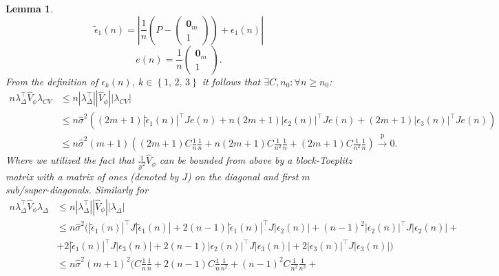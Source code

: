 \documentclass[11pt,dvipsnames]{article}
\newtheorem{lemma}{Lemma}
\begin{document}
\begin{appendices}
\begin{lemma}
\begin{equation}
\tilde{\epsilon}_{1}(n)=|\frac{1}{n}\left( P- \begin{pmatrix} \mathbf{0}_{m}\\1\end{pmatrix} \right) +\epsilon_{1}(n)|
\end{equation}
\begin{equation}
e(n)=\frac{1}{n}\begin{pmatrix} \mathbf{0}_{m}\\1\end{pmatrix} .
\end{equation}
From the definition of $ \epsilon_{k}(n) $, $ k \in \left\lbrace 1,\,2,\,3 \right\rbrace  $ it follows that $ \exists C, n_{0} : \forall n \geq n_{0} $:
\begin{equation}
\begin{split}
n\lambda_{\Delta}^{\top} \widehat{V}_{\phi} \lambda_{CV} &\leq n|\lambda_{\Delta}^{\top}| |\widehat{V}_{\phi}|| \lambda_{CV}|\\
&\leq n\hat{\sigma}^{2}\left(  (2m+1) |\tilde{\epsilon}_{1}(n)|^{\top}J e(n)+
n(2m+1)|\epsilon_{2}(n)|^{\top}J e(n)+
(2m+1)|\epsilon_{3}(n)|^{\top}J e(n)\right) \\
&\leq n\hat{\sigma}^{2}(m+1)\left( (2m+1) C \frac{1}{n}\frac{1}{n} + n(2m+1)C\frac{1}{n^{2}}\frac{1}{n} + (2m+1)C\frac{1}{n^{2}}\frac{1}{n}\right) \overset{\mathrm{p}}{\longrightarrow} 0.
\end{split}
\end{equation}
Where we utilized the fact that $ \frac{1}{\hat{\sigma}^{2}} \widehat{V}_{\phi} $ can be bounded from above by a block-Toeplitz matrix with a matrix of ones (denoted by $ J $) on the diagonal and first $ m $ sub/super-diagonals. Similarly for
\begin{equation}
\begin{split}
n\lambda_{\Delta}^{\top} \widehat{V}_{\phi} \lambda_{\Delta} &\leq n|\lambda_{\Delta}^{\top}| |\widehat{V}_{\phi}|| \lambda_{\Delta}|\\
&\leq n\hat{\sigma}^{2}( 
|\tilde{\epsilon}_{1}(n)|^{\top}J |\tilde{\epsilon}_{1}(n)|+
2(n-1)|\tilde{\epsilon}_{1}(n)|^{\top}J |\epsilon_{2}(n)|+
(n-1)^{2}|\epsilon_{2}(n)|^{\top}J |\epsilon_{2}(n)|+\\
&+ 2|\tilde{\epsilon}_{1}(n)|^{\top}J |\epsilon_{3}(n)|
+ 2(n-1)|\epsilon_{2}(n)|^{\top}J |\epsilon_{3}(n)|
+ 2|\epsilon_{3}(n)|^{\top}J |\epsilon_{3}(n)|
) \\
&\leq n\hat{\sigma}^{2}(m+1)^{2}( 
C \frac{1}{n}\frac{1}{n} + 
2(n-1)C \frac{1}{n}\frac{1}{n^{2}} + 
(n-1)^{2}C \frac{1}{n^{2}}\frac{1}{n^{2}} + \\

\end{split}
\end{equation}
\end{lemma}
\end{appendices}
\end{document}
